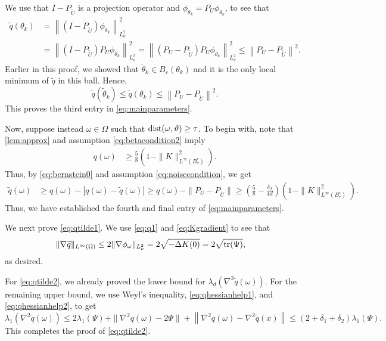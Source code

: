 \documentclass[11pt]{article}
\theoremstyle{definition}
\numberwithin{theorem}{section}
\numberwithin{lemma}{section}
\numberwithin{equation}{section}
\renewcommand{\tilde}{\widetilde}
\renewcommand{\epsilon}{\varepsilon}
\def\dist{{\rm dist}}
\def\trace{{\rm tr}}
\newcommand{\domain}{\Omega}
\newcommand{\norm}[1]{{\left\|#1\right\|}}
\numberwithin{equation}{section}
\begin{document}
    We use that $I-P_{\tilde U}$ is a projection operator and $\phi_{\theta_k}=P_U \phi_{\theta_k}$, to see that
	\begin{align*}
		\tilde q(\theta_k)
		&= \left\|\left(I-P_{\tilde U}\right) \phi_{\theta_k} \right\|_{L^2_\nu}^2 \\
		&= \left\| \left(I-P_{\tilde U}\right) P_U \phi_{\theta_k} \right\|_{L^2_\nu}^2
		= \left\|\left(P_U-P_{\tilde U}\right) P_U \phi_{\theta_k} \right\|_{L^2_\nu}^2 
		\leq \left\| P_U-P_{\tilde U} \right\|^2. 
	\end{align*}
	Earlier in this proof, we showed that $\tilde \theta_k\in B_\epsilon(\theta_k)$ and it is the only local minimum of $\tilde q$ in this ball. Hence,
	$$
	\tilde q(\tilde \theta_k)
	\leq \tilde q(\theta_k)
	\leq \left\| P_U-P_{\tilde U} \right\|^2.
	$$
	This proves the third entry in \eqref{eq:mainparameters}. 
	
    Now, suppose instead $\omega\in \domain$ such that $\dist(\omega,\vartheta)\geq \tau$. To begin with, note that \cref{lem:approx} and assumption \eqref{eq:betacondition2} imply 
    \begin{align*}
    	q(\omega)
    	&\geq \frac 58 \left( 1-\|K\|_{L^\infty(B_\tau^c)}^2 \right). 
    \end{align*}
   	Thus, by \eqref{eq:bernstein0} and assumption \eqref{eq:noisecondition}, we get
	\begin{align*}
		\tilde q(\omega)
		&\geq q(\omega)- |q(\omega)-\tilde q(\omega)| 
		\geq q(\omega) - \|P_U-P_{\tilde U}\|
		\geq \left(\frac 58-\frac{\delta_2}{4d}\right) \left( 1-\|K\|_{L^\infty(B_\tau^c)}^2 \right). 
	\end{align*}
	Thus, we have established the fourth and final entry of \eqref{eq:mainparameters}. 
	
	We next prove \eqref{eq:qtilde1}. We use \eqref{eq:q1} and \eqref{eq:Kgradient} to see that
	\begin{align*}
		\|\nabla \tilde q\|_{L^\infty(\Omega)}
		&\leq 2\|\nabla \phi_\omega\|_{L^2_\nu}
		= 2\sqrt{-\Delta K(0)}
		= 2\sqrt{\trace(\Psi)},
	\end{align*}
	as desired. 
	
	For \eqref{eq:qtilde2}, we already proved the lower bound for $\lambda_d \left( \nabla^2 \tilde q(\omega)\right)$. For the remaining upper bound, we use Weyl's inequality, \eqref{eq:qhessianhelp1}, and \eqref{eq:qhessianhelp2}, to get
	\begin{equation*}
		\lambda_1 \left( \nabla^2 \tilde q(\omega)\right)
		\leq 2\lambda_1(\Psi) + \|\nabla^2 q(\omega) - 2\Psi\| + \norm{\nabla^2 q(\omega)-\nabla^2 \tilde q(x)}
		\leq (2+\delta_1+\delta_2)\lambda_1(\Psi). 
	\end{equation*}
	This completes the proof of \eqref{eq:qtilde2}.
\end{document}
